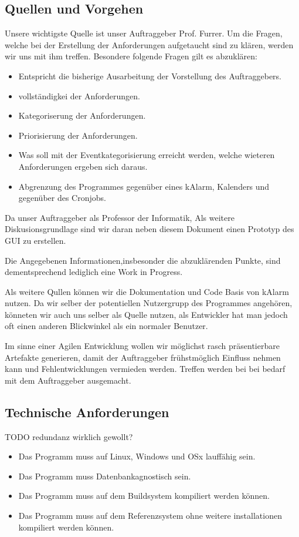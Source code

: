 \documentclass[11pt,titelpage]{scrreprt}
\begin{document}
\subsection{Quellen und Vorgehen}
Unsere wichtigste Quelle ist unser Auftraggeber Prof. Furrer. Um die Fragen, welche bei der Erstellung der Anforderungen aufgetaucht sind zu klären, werden wir uns mit ihm treffen.
Besondere folgende Fragen gilt es abzuklären:

\begin{itemize}
\item Entspricht die bisherige Ausarbeitung der Vorstellung des Auftraggebers.
\item vollständigkei der Anforderungen.
\item Kategoriserung der Anforderungen.
\item Priorisierung der Anforderungen.
\item Was soll mit der Eventkategorisierung erreicht werden, welche wieteren Anforderungen ergeben sich daraus.
\item Abgrenzung des Programmes gegenüber eines kAlarm, Kalenders und gegenüber des Cronjobs.
\end{itemize}
Da unser Auftraggeber als Professor der Informatik,
Als weitere Diskusionsgrundlage sind wir daran neben diesem Dokument einen Prototyp des GUI zu erstellen.


Die Angegebenen Informationen,insbesonder die abzuklärenden Punkte, sind dementsprechend lediglich eine Work in Progress.


Als weitere Qullen können wir die Dokumentation und Code Basis von kAlarm nutzen.
Da wir selber der potentiellen Nutzergrupp des Programmes angehören, könneten wir auch uns selber als Quelle nutzen, als Entwickler hat man jedoch oft einen anderen Blickwinkel als ein normaler Benutzer.


Im sinne einer Agilen Entwicklung wollen wir möglichst rasch präsentierbare Artefakte generieren, damit der Auftraggeber frühstmöglich Einfluss nehmen kann und Fehlentwicklungen vermieden werden. Treffen werden bei bei bedarf mit dem Auftraggeber ausgemacht.


\subsection{Technische Anforderungen}
TODO redundanz wirklich gewollt?

\begin{itemize}
 \item Das Programm muss auf Linux, Windows und OSx lauffähig sein.
 \item Das Programm muss Datenbankagnostisch sein.
 \item Das Programm muss auf dem Buildsystem kompiliert werden können.
 \item Das Programm muss auf dem Referenzsystem ohne weitere installationen  kompiliert werden können.
\end{itemize}
\end{document}
